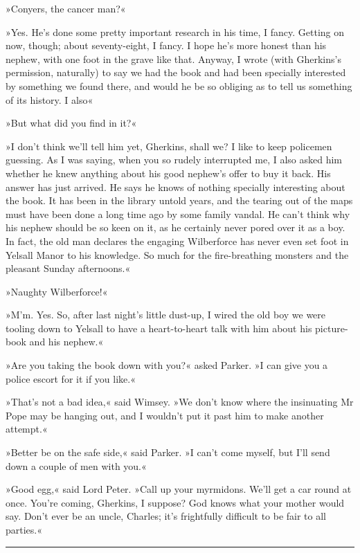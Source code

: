 »Conyers, the cancer man?«

»Yes. He's done some pretty important research in his time, I fancy. Getting on now, though; about seventy-eight, I fancy. I hope he's more honest than his nephew, with one foot in the grave like that. Anyway, I wrote (with Gherkins's permission, naturally) to say we had the book and had been specially interested by something we found there, and would he be so obliging as to tell us something of its history. I also\longdash«

»But what did you find in it?«

»I don't think we'll tell him yet, Gherkins, shall we? I like to keep policemen guessing. As I was saying, when you so rudely interrupted me, I also asked him whether he knew anything about his good nephew's offer to buy it back. His answer has just arrived. He says he knows of nothing specially interesting about the book. It has been in the library untold years, and the tearing out of the maps must have been done a long time ago by some family vandal. He can't think why his nephew should be so keen on it, as he certainly never pored over it as a boy. In fact, the old man declares the engaging Wilberforce has never even set foot in Yelsall Manor to his knowledge. So much for the fire-breathing monsters and the pleasant Sunday afternoons.«

»Naughty Wilberforce!«

»M'm. Yes. So, after last night's little dust-up, I wired the old boy we were tooling down to Yelsall to have a heart-to-heart talk with him about his picture-book and his nephew.«

»Are you taking the book down with you?« asked Parker. »I can give you a police escort for it if you like.«

»That's not a bad idea,« said Wimsey. »We don't know where the insinuating Mr Pope may be hanging out, and I wouldn't put it past him to make another attempt.«

»Better be on the safe side,« said Parker. »I can't come myself, but I'll send down a couple of men with you.«

»Good egg,« said Lord Peter. »Call up your myrmidons. We'll get a car round at once. You're coming, Gherkins, I suppose? God knows what your mother would say. Don't ever be an uncle, Charles; it's frightfully difficult to be fair to all parties.«

\noindent\hfil\rule{0.5\textwidth}{.4pt}\hfil 

